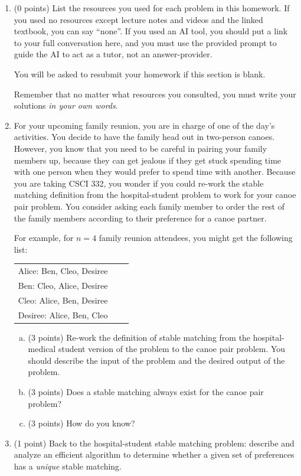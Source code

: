 \documentclass[11pt]{article}
\begin{document}


\begin{enumerate}


\item (0 points) List the resources you used for each problem in this homework. If you used no resources except
lecture notes and videos and the linked textbook, you can say ``none''. If you used
an AI tool, you should put a link to your full conversation here, and you must use the provided prompt to guide the AI to act
as a tutor, not an answer-provider.

You will be asked to resubmit your homework if this section is blank.

Remember that no matter what resources you consulted, you must write your solutions
\emph{in your own words}.

\item 

For your upcoming family reunion, you are in charge of one of the day's activities.
You decide to have the family head out in two-person canoes. However, you know that
you need to be careful in pairing your family members up, because they can get jealous
if they get stuck spending time with one person when they would prefer to spend time with another.
Because you are taking CSCI 332, you wonder if you could re-work the stable matching
definition from the hospital-student problem to work for your canoe pair problem. You consider
asking each family member to order the rest of the family members according to their
preference for a canoe partner.

For example, for $n=4$ family reunion attendees, you might get the following list:

\begin{center}
\begin{tabular}{ c c c }
    Alice: Ben, Cleo, Desiree \\
    Ben: Cleo, Alice, Desiree \\
    Cleo: Alice, Ben, Desiree\\
    Desiree: Alice, Ben, Cleo
\end{tabular}
\end{center}


\begin{enumerate}[(a)]
    \item (3 points) Re-work the definition of stable matching from the hospital-medical student
        version of the problem to the canoe pair problem.
        You should describe the input of the problem and the desired output of the problem.
    \item (3 points) Does a stable matching always exist for the canoe pair problem?
    \item (3 points) How do you know?
\end{enumerate}

\item (1 point) Back to the hospital-student stable matching problem: describe
and analyze an efficient algorithm to determine whether a given set of preferences
has a \emph{unique} stable matching.

\end{enumerate}
\end{document}
